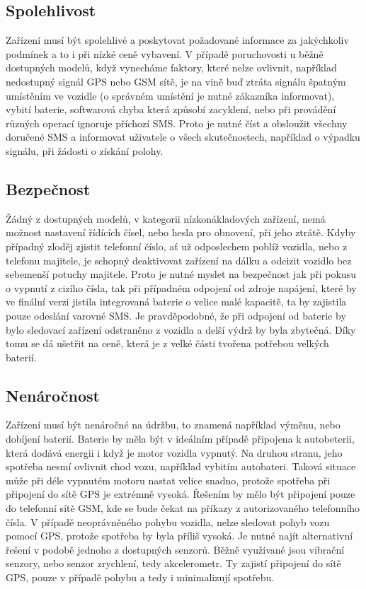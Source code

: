 \documentclass[FM,BP]{tulthesis}  %
\begin{document}
\subsection{Spolehlivost}
Zařízení musí být spolehlivé a poskytovat požadované informace za jakýchkoliv podmínek a to i při nízké ceně vybavení. V případě poruchovosti u běžně dostupných modelů, když vynecháme faktory, které nelze ovlivnit, například nedostupný signál GPS nebo GSM sítě, je na vině buď ztráta signálu špatným umístěním ve vozidle (o správném umístění je nutné zákazníka informovat), vybití baterie, softwarová chyba která způsobí zacyklení, nebo při provádění různých operací ignoruje příchozí SMS. Proto je nutné číst a obsloužit všechny doručené SMS a informovat uživatele o všech skutečnostech, například o výpadku signálu, při žádosti o získání polohy.

\subsection{Bezpečnost}
Žádný z dostupných modelů, v kategorii nízkonákladových zařízení, nemá možnost nastavení řídících čísel, nebo hesla pro obnovení, při jeho ztrátě. Kdyby případný zloděj zjistit telefonní číslo, ať už odposlechem poblíž vozidla, nebo z telefonu majitele, je schopný deaktivovat zařízení na dálku a odcizit vozidlo bez sebemenší potuchy majitele. Proto je nutné myslet na bezpečnost jak při pokusu o vypnutí z cizího čísla, tak při případném odpojení od zdroje napájení, které by ve finální verzi jistila integrovaná baterie o velice malé kapacitě, ta by zajistila pouze odeslání varovné SMS. Je pravděpodobné, že při odpojení od baterie by bylo sledovací zařízení odstraněno z vozidla a delší výdrž by byla zbytečná. Díky tomu se dá ušetřit na ceně, která je z velké části tvořena potřebou velkých baterií.

\subsection{Nenáročnost}
Zařízení musí být nenáročné na údržbu, to znamená například výměnu, nebo dobíjení baterií. Baterie by měla být v ideálním případě připojena k autobeterii, která dodává energii i když je motor vozidla vypnutý. Na druhou stranu, jeho spotřeba nesmí ovlivnit chod vozu, například vybitím autobateri. Taková situace může při déle vypnutém motoru nastat velice snadno, protože spotřeba při připojení do sítě GPS je extrémně vysoká. Řešením by mělo být připojení pouze do telefonní sítě GSM, kde se bude čekat na příkazy z autorizovaného telefonního čísla. V případě neoprávněného pohybu vozidla, nelze sledovat pohyb vozu pomocí GPS, protože spotřeba by byla příliš vysoká. Je nutné najít alternativní řešení v podobě jednoho z dostupných senzorů. Běžně využívané jsou vibrační senzory, nebo senzor zrychlení, tedy akcelerometr. Ty zajistí připojení do sítě GPS, pouze v případě pohybu a tedy i minimalizují spotřebu.
\end{document}
